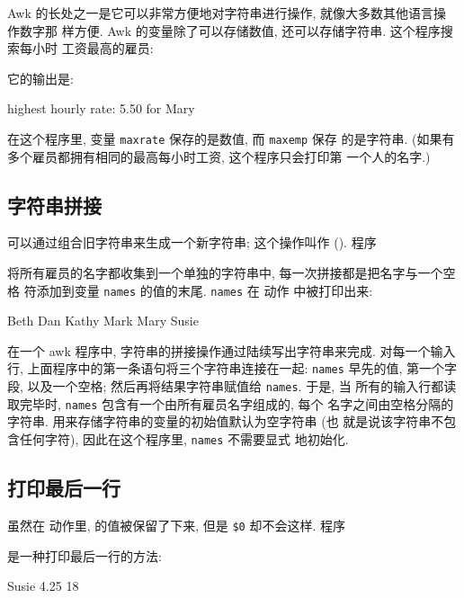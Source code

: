Awk 的长处之一是它可以非常方便地对字符串进行操作, 就像大多数其他语言操
作数字那
样方便. Awk 的变量除了可以存储数值, 还可以存储字符串. 这个程序搜索每小时
工资最高的雇员:
它的输出是:
\begin{file}
    highest hourly rate: 5.50 for Mary
\end{file}
在这个程序里, 变量 \texttt{maxrate} 保存的是数值, 而 \texttt{maxemp} 保存
的是字符串. (如果有多个雇员都拥有相同的最高每小时工资, 这个程序只会打印第
一个人的名字.)

\subsection{字符串拼接}
\label{subsec:string_concatenation}

可以通过组合旧字符串来生成一个新字符串; 这个操作叫作
(). 程序
将所有雇员的名字都收集到一个单独的字符串中, 每一次拼接都是把名字与一个空格
符添加到变量 \texttt{names} 的值的末尾. \texttt{names} 在 \END 动作
中被打印出来:
\begin{file}
    Beth Dan Kathy Mark Mary Susie 
\end{file}
在一个 awk 程序中, 字符串的拼接操作通过陆续写出字符串来完成. 对每一个输入行,
上面程序中的第一条语句将三个字符串连接在一起: \texttt{names} 早先的值,
第一个字段, 以及一个空格; 然后再将结果字符串赋值给 \texttt{names}. 于是, 当
所有的输入行都读取完毕时, \texttt{names} 包含有一个由所有雇员名字组成的,
每个
名字之间由空格分隔的字符串. 用来存储字符串的变量的初始值默认为空字符串 (也
就是说该字符串不包含任何字符), 因此在这个程序里, \texttt{names} 不需要显式
地初始化.

\subsection{打印最后一行}
\label{subsec:printing_the_last_input_line}

虽然在 \END 动作里, \nr 的值被保留了下来, 但是 \verb'$0' 却不会这样. 程序
是一种打印最后一行的方法:
\begin{file}
    Susie   4.25    18
\end{file}

